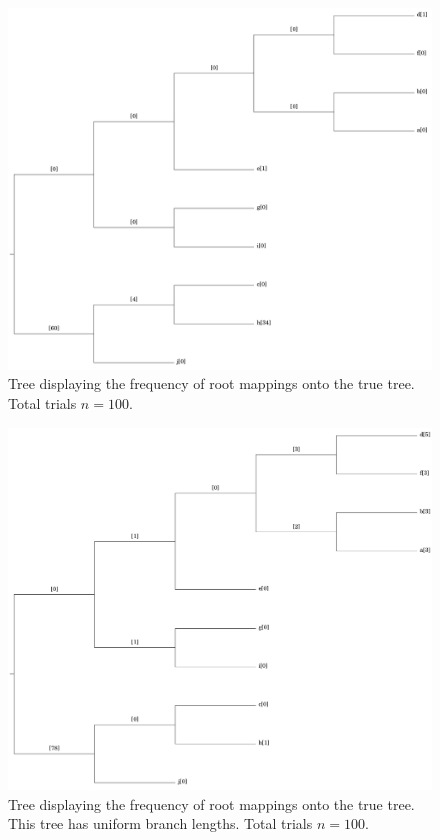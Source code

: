\documentclass{article}
\begin{document}
\begin{table}
\begin{center}
  
  \label{table:results}
\end{center}
\end{table}

\begin{figure}
  \includegraphics[width=.9\linewidth]{figs/random_tree_6400_sites.png}
  \caption{Tree displaying the frequency of root mappings onto the true tree.
  Total trials $n=100$.}
  \label{fig:mapped_tree}
\end{figure}

\begin{figure}
  \includegraphics[width=.9\linewidth]{figs/uniform_tree_6400_sites.png}
  \caption{Tree displaying the frequency of root mappings onto the true tree.
    This tree has uniform branch lengths. Total trials $n=100$.}
  \label{fig:mapped_uniform_tree}
\end{figure}
\end{document}
